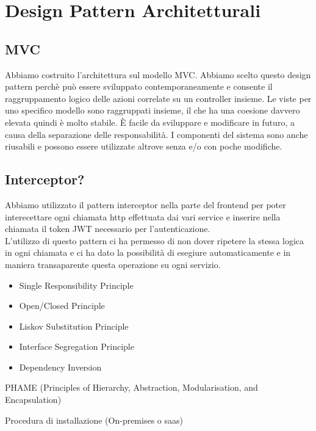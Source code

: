 \documentclass{article}
\begin{document}
\section{Design Pattern Architetturali}
\subsection{MVC}
Abbiamo costruito l'architettura sul modello MVC. Abbiamo scelto questo design pattern perchè può essere sviluppato contemporaneamente e consente il raggruppamento logico delle azioni correlate su un controller insieme. Le viste per uno specifico modello sono raggruppati insieme, il che ha una coesione davvero elevata quindi è molto stabile. È facile da sviluppare e modificare in futuro, a causa della separazione delle responsabilità. I componenti del sistema sono anche riusabili e possono essere utilizzate altrove senza e/o con poche modifiche.

\subsection{Interceptor?}
Abbiamo utilizzato il pattern interceptor nella parte del frontend per poter interecettare ogni chiamata http effettuata dai vari service e inserire nella chiamata il token JWT necessario per l’autenticazione.\\
L’utilizzo di questo pattern ci ha permesso di non dover ripetere la stessa logica in ogni chiamata e ci ha dato la possibilità di esegiure automaticamente e in maniera transaparente questa operazione su ogni servizio.
\begin{itemize}

\item Single Responsibility Principle
\item Open/Closed Principle
\item Liskov Substitution Principle
\item Interface Segregation Principle
\item Dependency Inversion
\end{itemize}

PHAME (Principles of Hierarchy, Abstraction, Modularisation, and Encapsulation)

 

Procedura di installazione (On-premises o saas)
\end{document}
